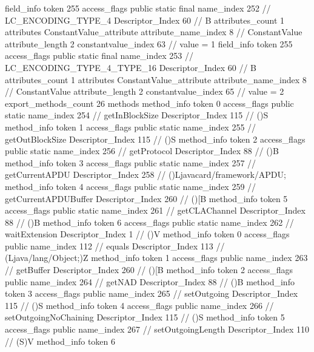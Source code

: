{{{{{{{				}
				}
			}
			field_info {
				token	255
				access_flags	public static final
				name_index	252		// LC_ENCODING_TYPE_4
				Descriptor_Index	60		// B
				attributes_count	1
				attributes {
				ConstantValue_attribute {
					attribute_name_index	8		// ConstantValue
					attribute_length	2
					constantvalue_index	63		// value = 1
				}
				}
			}
			field_info {
				token	255
				access_flags	public static final
				name_index	253		// LC_ENCODING_TYPE_4_TYPE_16
				Descriptor_Index	60		// B
				attributes_count	1
				attributes {
				ConstantValue_attribute {
					attribute_name_index	8		// ConstantValue
					attribute_length	2
					constantvalue_index	65		// value = 2
				}
				}
			}
			}
			export_methods_count	26
			methods {
				method_info {
					token	0
					access_flags	public static
					name_index	254		// getInBlockSize
					Descriptor_Index	115		// ()S
				}
				method_info {
					token	1
					access_flags	public static
					name_index	255		// getOutBlockSize
					Descriptor_Index	115		// ()S
				}
				method_info {
					token	2
					access_flags	public static
					name_index	256		// getProtocol
					Descriptor_Index	88		// ()B
				}
				method_info {
					token	3
					access_flags	public static
					name_index	257		// getCurrentAPDU
					Descriptor_Index	258		// ()Ljavacard/framework/APDU;
				}
				method_info {
					token	4
					access_flags	public static
					name_index	259		// getCurrentAPDUBuffer
					Descriptor_Index	260		// ()[B
				}
				method_info {
					token	5
					access_flags	public static
					name_index	261		// getCLAChannel
					Descriptor_Index	88		// ()B
				}
				method_info {
					token	6
					access_flags	public static
					name_index	262		// waitExtension
					Descriptor_Index	1		// ()V
				}
				method_info {
					token	0
					access_flags	public
					name_index	112		// equals
					Descriptor_Index	113		// (Ljava/lang/Object;)Z
				}
				method_info {
					token	1
					access_flags	public
					name_index	263		// getBuffer
					Descriptor_Index	260		// ()[B
				}
				method_info {
					token	2
					access_flags	public
					name_index	264		// getNAD
					Descriptor_Index	88		// ()B
				}
				method_info {
					token	3
					access_flags	public
					name_index	265		// setOutgoing
					Descriptor_Index	115		// ()S
				}
				method_info {
					token	4
					access_flags	public
					name_index	266		// setOutgoingNoChaining
					Descriptor_Index	115		// ()S
				}
				method_info {
					token	5
					access_flags	public
					name_index	267		// setOutgoingLength
					Descriptor_Index	110		// (S)V
				}
				method_info {
					token	6
}}}}}
